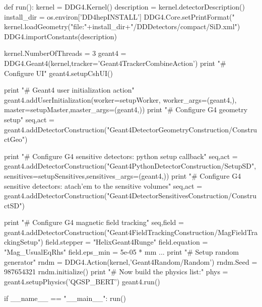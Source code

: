 \begin{code}
def run():
  kernel = DDG4.Kernel()
  description = kernel.detectorDescription()
  install_dir = os.environ['DD4hepINSTALL']
  DDG4.Core.setPrintFormat("%
  kernel.loadGeometry("file:"+install_dir+"/DDDetectors/compact/SiD.xml")
  DDG4.importConstants(description)

  kernel.NumberOfThreads = 3
  geant4 = DDG4.Geant4(kernel,tracker='Geant4TrackerCombineAction')
  print "#  Configure UI"
  geant4.setupCshUI()

  print "#  Geant4 user initialization action"
  geant4.addUserInitialization(worker=setupWorker, worker_args=(geant4,),
                               master=setupMaster,master_args=(geant4,))
  print "#  Configure G4 geometry setup"
  seq,act = geant4.addDetectorConstruction("Geant4DetectorGeometryConstruction/ConstructGeo")

  print "# Configure G4 sensitive detectors: python setup callback"
  seq,act = geant4.addDetectorConstruction("Geant4PythonDetectorConstruction/SetupSD",
                                           sensitives=setupSensitives,sensitives_args=(geant4,))
  print "# Configure G4 sensitive detectors: atach'em to the sensitive volumes"
  seq,act = geant4.addDetectorConstruction("Geant4DetectorSensitivesConstruction/ConstructSD")

  print "#  Configure G4 magnetic field tracking"
  seq,field = geant4.addDetectorConstruction("Geant4FieldTrackingConstruction/MagFieldTrackingSetup")
  field.stepper            = "HelixGeant4Runge"
  field.equation           = "Mag_UsualEqRhs"
  field.eps_min            = 5e-05 * mm
  ...
  print "#  Setup random generator"
  rndm = DDG4.Action(kernel,'Geant4Random/Random')
  rndm.Seed = 987654321
  rndm.initialize()
  print "#  Now build the physics list:"
  phys = geant4.setupPhysics('QGSP_BERT')
  geant4.run()

if __name__ == "__main__":
  run()
\end{code}

\newpage